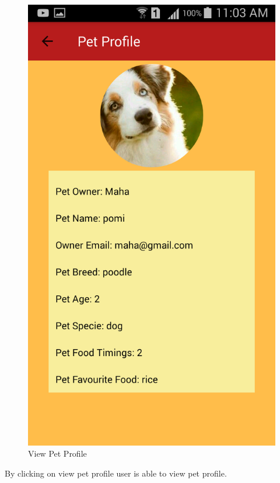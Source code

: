 \begin{figure}[H]
  \centering
    \includegraphics[scale=0.3]{84viewpetprofile}
      \caption{View Pet Profile}
\end{figure}

By clicking on view pet profile user is able to view pet profile.

\newpage

